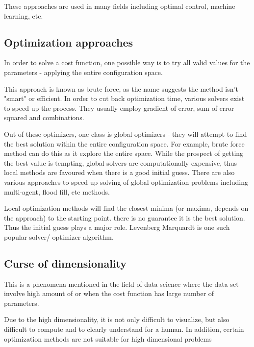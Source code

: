 \documentclass[english, printversion, nomenclature, notitle]{tuvisionthesis} %
\begin{document}

These approaches are used in many fields including optimal control, machine learning, etc.

\subsection{Optimization approaches}

In order to solve a cost function, one possible way is to try all valid values for the parameters - applying the entire configuration space.

This approach is known as brute force, as the name suggests the method isn't "smart" or efficient. In order to cut back optimization time, various solvers exist to speed up the process. They usually employ gradient of error, sum of error squared and combinations.

Out of these optimizers, one class is global optimizers - they will attempt to find the best solution within the entire configuration space. For example, brute force method can do this as it explore the entire space. While the prospect of getting the best value is tempting, global solvers are computationally expensive, thus local methods are favoured when there is a good initial guess. There are also various approaches to speed up solving of global optimization problems including multi-agent, flood fill, etc methods. 

Local optimization methods will find the closest minima (or maxima, depends on the approach) to the starting point. there is no guarantee it is the best solution. Thus the initial guess plays a major role. Levenberg Marquardt is one such popular solver/ optimizer algorithm.


\subsection{Curse of dimensionality}
This is a phenomena mentioned in the field of data science where the data set involve high amount of or when the cost function has large number of parameters.

Due to the high dimensionality, it is not only difficult to visualize, but also difficult to compute and to clearly understand for a human. In addition, certain optimization methods are not suitable for high dimensional problems 
\end{document}
